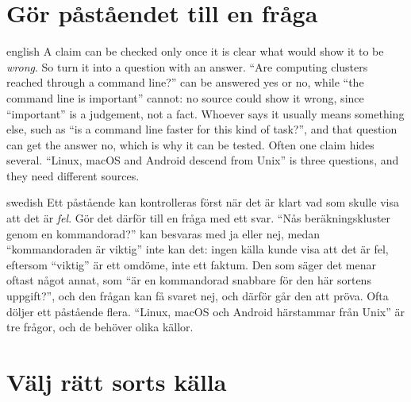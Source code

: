 \section{%
  {Gör påståendet till en fråga}} %

\begin{onlyin}{english} %
A claim can be checked only once it is clear what would show it to be
\emph{wrong}.  So turn it into a question with an answer.  \enquote{Are
computing clusters reached through a command line?} can be answered yes
or no, while \enquote{the command line is important} cannot: no source
could show it wrong, since \enquote{important} is a judgement, not a
fact.  Whoever says it usually means something else, such as \enquote{is
a command line faster for this kind of task?}, and that question can get
the answer no, which is why it can be tested.  Often one claim hides
several.  \enquote{Linux, macOS and Android descend from Unix} is three
questions, and they need different sources.
\end{onlyin}
\begin{onlyin}{swedish}
Ett påstående kan kontrolleras först när det är klart vad som skulle
visa att det är \emph{fel}.  Gör det därför till en fråga med ett svar.
\enquote{Nås beräkningskluster genom en kommandorad?} kan besvaras med
ja eller nej, medan \enquote{kommandoraden är viktig} inte kan det:
ingen källa kunde visa att det är fel, eftersom \enquote{viktig} är ett
omdöme, inte ett faktum.  Den som säger det menar oftast något annat,
som \enquote{är en kommandorad snabbare för den här sortens uppgift?},
och den frågan kan få svaret nej, och därför går den att pröva.  Ofta
döljer ett påstående flera.  \enquote{Linux, macOS och Android
härstammar från Unix} är tre frågor, och de behöver olika källor.
\end{onlyin}

\section{%
  {Välj rätt sorts källa}} %

